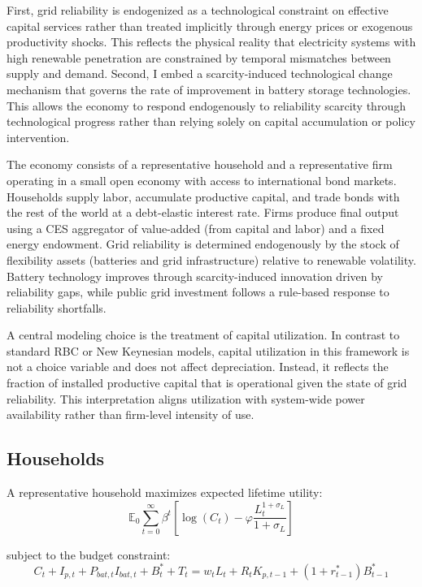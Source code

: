 \documentclass[12pt, a4paper]{article}
\begin{document}
First, grid reliability is endogenized as a technological constraint on effective capital services rather than treated implicitly through energy prices or exogenous productivity shocks. This reflects the physical reality that electricity systems with high renewable penetration are constrained by temporal mismatches between supply and demand. Second, I embed a scarcity-induced technological change mechanism that governs the rate of improvement in battery storage technologies. This allows the economy to respond endogenously to reliability scarcity through technological progress rather than relying solely on capital accumulation or policy intervention.

The economy consists of a representative household and a representative firm operating in a small open economy with access to international bond markets. Households supply labor, accumulate productive capital, and trade bonds with the rest of the world at a debt-elastic interest rate. Firms produce final output using a CES aggregator of value-added (from capital and labor) and a fixed energy endowment. Grid reliability is determined endogenously by the stock of flexibility assets (batteries and grid infrastructure) relative to renewable volatility. Battery technology improves through scarcity-induced innovation driven by reliability gaps, while public grid investment follows a rule-based response to reliability shortfalls.

A central modeling choice is the treatment of capital utilization. In contrast to standard RBC or New Keynesian models, capital utilization in this framework is not a choice variable and does not affect depreciation. Instead, it reflects the fraction of installed productive capital that is operational given the state of grid reliability. This interpretation aligns utilization with system-wide power availability rather than firm-level intensity of use.

\subsection{Households} \label{sec:households}

A representative household maximizes expected lifetime utility:
\begin{equation}
\mathbb{E}_0 \sum_{t=0}^{\infty} \beta^t
\left[
\log(C_t) - \varphi \frac{L_t^{1+\sigma_L}}{1+\sigma_L}
\right]
\label{eq:utility}
\end{equation}

subject to the budget constraint:
\begin{equation}
C_t + I_{p,t} + P_{bat,t} I_{bat,t} + B^*_t + T_t
=
w_t L_t + R_t K_{p,t-1} + (1+r^*_{t-1}) B^*_{t-1}
\label{eq:hh_budget}
\end{equation}
\end{document}
